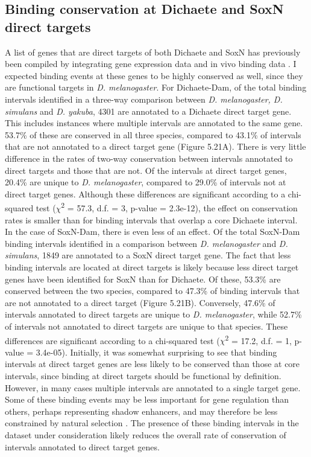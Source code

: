 \subsection{Binding conservation at Dichaete and SoxN direct targets}
A list of genes that are direct targets of both Dichaete and SoxN has previously been compiled by integrating gene expression data and in vivo binding data \citep{aleksic_role_2013,ferrero_soxneuro_2014}. I expected binding events at these genes to be highly conserved as well, since they are functional targets in \emph{D. melanogaster}. For Dichaete-Dam, of the total binding intervals identified in a three-way comparison between \emph{D. melanogaster, D. simulans} and \emph{D. yakuba}, 4301 are annotated to a Dichaete direct target gene. This includes instances where multiple intervals are annotated to the same gene. 53.7\% of these are conserved in all three species, compared to 43.1\% of intervals that are not annotated to a direct target gene (Figure 5.21A). There is very little difference in the rates of two-way conservation between intervals annotated to direct targets and those that are not. Of the intervals at direct target genes, 20.4\% are unique to \emph{D. melanogaster}, compared to 29.0\% of intervals not at direct target genes. Although these differences are significant according to a chi-squared test (\(\chi\)\textsuperscript{2} = 57.3, d.f. = 3, p-value = 2.3e-12), the effect on conservation rates is smaller than for binding intervals that overlap a core Dichaete interval.\\

In the case of SoxN-Dam, there is even less of an effect. Of the total SoxN-Dam binding intervals identified in a comparison between \emph{D. melanogaster} and \emph{D. simulans}, 1849 are annotated to a SoxN direct target gene. The fact that less binding intervals are located at direct targets is likely because less direct target genes have been identified for SoxN than for Dichaete. Of these, 53.3\% are conserved between the two species, compared to 47.3\% of binding intervals that are not annotated to a direct target (Figure 5.21B). Conversely, 47.6\% of intervals annotated to direct targets are unique to \emph{D. melanogaster}, while 52.7\% of intervals not annotated to direct targets are unique to that species. These differences are significant according to a chi-squared test (\(\chi\)\textsuperscript{2} = 17.2, d.f. = 1, p-value = 3.4e-05). Initially, it was somewhat surprising to see that binding intervals at direct target genes are less likely to be conserved than those at core intervals, since binding at direct targets should be functional by definition. However, in many cases multiple intervals are annotated to a single target gene. Some of these binding events may be less important for gene regulation than others, perhaps representing shadow enhancers, and may therefore be less constrained by natural selection \citep{ludwig_consequences_2011,perry_shadow_2010}. The presence of these binding intervals in the dataset under consideration likely reduces the overall rate of conservation of intervals annotated to direct target genes.

